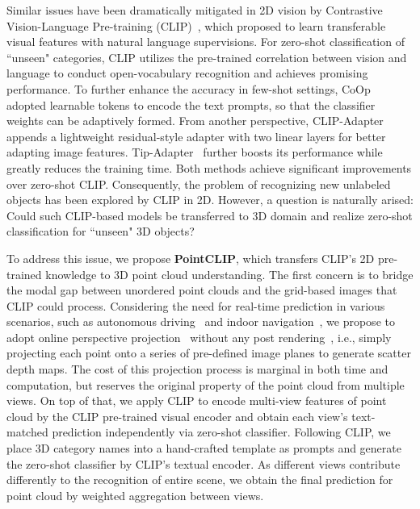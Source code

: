 \documentclass[10pt,twocolumn,letterpaper]{article}
\begin{document}
Similar issues have been dramatically mitigated in 2D vision by Contrastive Vision-Language Pre-training (CLIP)~\cite{radford2021learning}, which proposed to learn transferable visual features with natural language supervisions. For zero-shot classification of ``unseen" categories, CLIP utilizes the pre-trained correlation between vision and language to conduct open-vocabulary recognition and achieves promising performance. To further enhance the accuracy in few-shot settings, CoOp~\cite{zhou2021coop} adopted learnable tokens to encode the text prompts, so that the classifier weights can be adaptively formed. From another perspective, CLIP-Adapter~\cite{gao2021clip} appends a lightweight residual-style adapter with two linear layers for better adapting image features. Tip-Adapter~\cite{zhang2021tip} further boosts its performance while greatly reduces the training time. Both methods achieve significant improvements over zero-shot CLIP. Consequently, the problem of recognizing new unlabeled objects has been explored by CLIP in 2D. However, a question is naturally arised: Could such CLIP-based models be transferred to 3D domain and realize zero-shot classification for ``unseen" 3D objects?

To address this issue, we propose \textbf{PointCLIP}, which transfers CLIP's 2D pre-trained knowledge to 3D point cloud understanding. The first concern is to bridge the modal gap between unordered point clouds and the grid-based images that CLIP could process. Considering the need for real-time prediction in various scenarios, such as autonomous driving~\cite{lang2019pointpillars, engelcke2017vote3deep, chen2017multi,qi2018frustum} and indoor navigation~\cite{zhu2017target}, we propose to adopt online perspective projection~\cite{goyal2021revisiting} without any post rendering~\cite{su2015multi}, i.e., simply projecting each point onto a series of pre-defined image planes to generate scatter depth maps. The cost of this projection process is marginal in both time and computation, but reserves the original property of the point cloud from multiple views. On top of that, we apply CLIP to encode multi-view features of point cloud by the CLIP pre-trained visual encoder and obtain each view's text-matched prediction independently via zero-shot classifier. Following CLIP, we place 3D category names into a hand-crafted template as prompts and generate the zero-shot classifier by CLIP's textual encoder. As different views contribute differently to the recognition of entire scene, we obtain the final prediction for point cloud by weighted aggregation between views.
\end{document}
